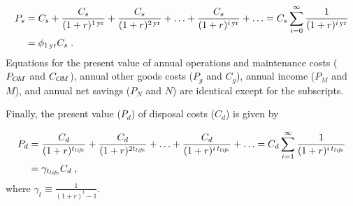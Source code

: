 \begin{align}
\footnotesize{}
  P_s &= C_s + \frac{C_s}{(1 + r)^{1\,\mathrm{yr}}} + \frac{C_s}{(1 + r)^{2\,\mathrm{yr}}} + 
         \ldots + \frac{C_s}{(1 + r)^{i\,\mathrm{yr}}} + \ldots 
       = C_s \sum_{i = 0}^{\infty} \frac{1}{(1 + r)^{i\,\mathrm{yr}}} \nonumber \\
      &= \phi_{1\,\mathrm{yr}} C_s \; .
\end{align}
%
Equations for 
the present value of 
annual operations and maintenance costs ($P_{O\!M}$ and $C_{O\!M}$), 
annual other goods costs ($P_g$ and $C_g$), 
annual income ($P_M$ and $M$), and 
annual net savings ($P_N$ and $N$)
are identical except for the subscripts.

Finally, the present value ($P_d$) of disposal costs ($C_d$) is given by

\begin{align}
\footnotesize{}
  P_d &= \frac{C_d}{(1 + r)^{\tlife}} + \frac{C_d}{(1 + r)^{2 \tlife}} + 
         \ldots + \frac{C_d}{(1 + r)^{\itlife}} + \ldots 
       = C_d \sum_{i = 1}^{\infty} \frac{1}{(1 + r)^{\itlife}} \nonumber \\
      &= \gamma_{\tlife} C_d \; ,
\end{align}
%
where 
$\gamma_t \equiv \frac{1}{(1 + r)^t - 1}$.



